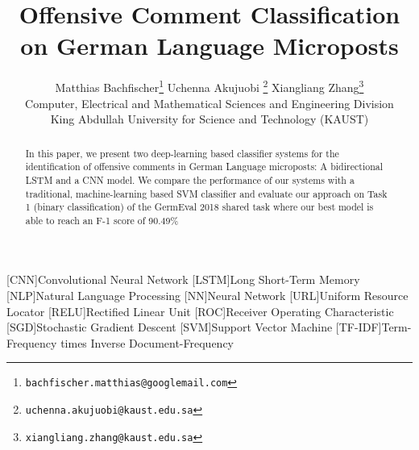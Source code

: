 \documentclass[11pt]{article}
\title{Offensive Comment Classification on German Language Microposts}
\author{Matthias Bachfischer\thanks{\tt \space bachfischer.matthias@googlemail.com} \qquad Uchenna Akujuobi \thanks{\tt  \space uchenna.akujuobi@kaust.edu.sa} \qquad Xiangliang Zhang\thanks{\tt  \space xiangliang.zhang@kaust.edu.sa} \\
   Computer, Electrical and Mathematical Sciences and Engineering Division \\
     King Abdullah University for Science and Technology (KAUST) \\
}
\date{}
\begin{document}
\begin{acronym}[\hspace{1.8cm}]
[CNN]{Convolutional Neural Network}
[LSTM]{Long Short-Term Memory}
 [NLP]{Natural Language Processing}
 [NN]{Neural Network}
 [URL]{Uniform Resource Locator}
 [RELU]{Rectified Linear Unit}
 [ROC]{Receiver Operating Characteristic}
 [SGD]{Stochastic Gradient Descent}
[SVM]{Support Vector Machine}
[TF-IDF]{Term-Frequency times Inverse Document-Frequency}

\end{acronym}

\maketitle
\begin{abstract}
In this paper, we present two deep-learning based classifier systems for the identification of offensive comments in German Language microposts: A bidirectional LSTM and a CNN model. We compare the performance of our systems with a traditional, machine-learning based SVM classifier and evaluate our approach on Task 1 (binary classification) of the GermEval 2018 shared task where our best model is able to reach an F-1 score of 90.49\% 
\end{abstract}

\nocite{RN65}
\end{document}
